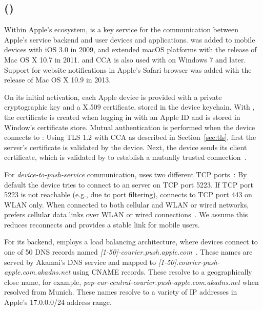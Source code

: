 \subsection{{\apnslong} ({\apns})}
\label{sec:apns}
%
Within Apple's ecosystem, \apns is a key service for the communication between Apple's service backend and user devices and applications. 
{\apns} was added to mobile devices with iOS 3.0 in 2009, and extended macOS platforms with the release of Mac OS X 10.7 in 2011. 
{\apns} and CCA is also used with \itunes on Windows 7 and later. 
Support for website notifications in Apple's Safari browser was added with the release of Mac OS X 10.9 in 2013.

On its initial activation, each Apple device is provided with a private cryptographic key and a X.509
certificate, stored in the device keychain.
With \itunes, the certificate is created when logging in with
an Apple ID and is stored in Window's certificate store. Mutual authentication
is performed when the device connects to {\apns}: Using TLS 1.2 with CCA as
described in Section~\ref{sec:tls}, first the server's certificate is validated
by the device. Next, the device sends its client certificate, which is validated
by {\apns} to establish a mutually trusted connection~\cite{2016appleapns}.

For \textit{device-to-push-service} communication, {\apns} uses two different TCP
ports~\cite{2016appleapnstrouble}: By default the device tries to connect to an
{\apns} server on TCP port 5223. If TCP port 5223 is not reachable (e.g., due to
port filtering), {\apns} connects to TCP port 443 on WLAN only.
% 
When connected to both cellular and WLAN or wired networks, {\apns} prefers cellular data
links over WLAN or wired connections~\cite{2016appleapnstrouble}. 
We assume this reduces reconnects and provides a stable link for mobile users.

For its backend, {\apns} employs a load balancing architecture, where
devices connect to one of 50 {\apns} DNS records named
\textit{{[1-50]-courier.push.apple.com}}~\cite{2016appleapnstrouble}. 
These names are served by Akamai's DNS service and mapped to
\textit{{[1-50]\-.courier\--push\--apple\-.com\-.akadns\-.net}}
using CNAME records. 
These resolve to a geographically close name, for example, 
\textit{{pop\--eur\--central\--courier\-.push\--apple\-.com\-.akadns\-.net}}
when resolved from Munich. 
These names resolve to a variety of IP addresses in Apple's 17.0.0.0/24 address range.
%
